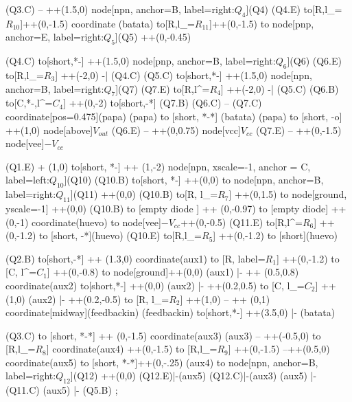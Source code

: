 \begin{circuitikz}
	(Q3.C) -- ++(1.5,0) node[npn, anchor=B, label=right:$Q_4$](Q4){}
	(Q4.E) to[R,l_=$R_{10}$]++(0,-1.5) coordinate (batata) to[R,l_=$R_{11}$]++(0,-1.5)
	to node[pnp, anchor=E, label=right:$Q_5$](Q5){} ++(0,-0.45)
	
	(Q4.C) to[short,*-] ++(1.5,0) node[pnp, anchor=B, label=right:$Q_6$](Q6){}
	(Q6.E) to[R,l_=$R_3$] ++(-2,0) -| (Q4.C)
	(Q5.C) to[short,*-] ++(1.5,0) node[npn, anchor=B, label=right:$Q_7$](Q7){}
	(Q7.E) to[R,l^=$R_4$] ++(-2,0) -| (Q5.C)
	(Q6.B) to[C,*-,l^=$C_4$] ++(0,-2) to[short,-*] (Q7.B)
	(Q6.C) -- (Q7.C) coordinate[pos=0.475](papa) 
	(papa) to [short, *-*] (batata)
	(papa) to [short, -o] ++(1,0) node[above]{$V_{out}$}
	(Q6.E) -- ++(0,0.75) node[vcc]{$V_{cc}$}
	(Q7.E) -- ++(0,-1.5) node[vee]{$-V_{cc}$}
	
	
	(Q1.E) + (1,0) to[short, *-] ++ (1,-2) node[npn, xscale=-1, anchor = C, label=left:$Q_{10}$](Q10){}
	(Q10.B) to[short, *-] ++(0,0) to node[npn, anchor=B, label=right:$Q_{11}$](Q11){} ++(0,0)
	(Q10.B) to[R, l_=$R_7$] ++(0,1.5) to node[ground, yscale=-1]{} ++(0,0)
	(Q10.B) to [empty diode ] ++ (0,-0.97)
	to [empty diode] ++ (0,-1) coordinate(huevo)
	to node[vee]{$-V_{cc}$}++(0,-0.5)
	(Q11.E) to[R,l^=$R_6$] ++(0,-1.2) to [short, -*](huevo)
	(Q10.E) to[R,l_=$R_5$] ++(0,-1.2) to [short](huevo)	
	
	
	
	(Q2.B) to[short,-*] ++ (1.3,0) coordinate(aux1){}
	to [R, label=$R_1$] ++(0,-1.2) to [C, l^=$C_1$] ++(0,-0.8) to node[ground]{}++(0,0)
	(aux1) |- ++ (0.5,0.8) coordinate(aux2){} to[short,*-] ++(0,0)
	(aux2) |- ++(0.2,0.5) to [C, l_=$C_2$] ++(1,0) 
	(aux2) |- ++(0.2,-0.5) to [R, l_=$R_2$] ++(1,0)
	-- ++ (0,1) coordinate[midway](feedbackin)
	(feedbackin) to[short,*-] ++(3.5,0) |- (batata)
	
	(Q3.C) to [short, *-*] ++ (0,-1.5) coordinate(aux3)
	(aux3) -- ++(-0.5,0) to [R,l_=$R_8$] coordinate(aux4) ++(0,-1.5) to [R,l_=$R_9$] ++(0,-1.5) --++(0.5,0) coordinate(aux5) to [short, *-*]++(0,-.25)
	(aux4) to node[npn, anchor=B, label=right:$Q_{12}$](Q12){} ++(0,0) 
	(Q12.E)|-(aux5)
	(Q12.C)|-(aux3)
	(aux5) |- (Q11.C)	
	(aux5) |- (Q5.B)
	;
\end{circuitikz}%